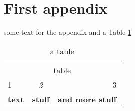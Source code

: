 \section{First appendix}\label{appen1}
some text for the appendix and a Table \ref{tab1}

\begin{table}[]
    \begin{tabular}{lll}
        \multicolumn{3}{c}{table}                                                \\
        1             & \multicolumn{1}{c}{\textit{2}} & \multicolumn{1}{r}{3}   \\
        \textbf{text} & \textbf{stuff}                 & \textbf{and more stuff}
    \end{tabular}
    \caption{a table}
    \label{tab1}
\end{table}